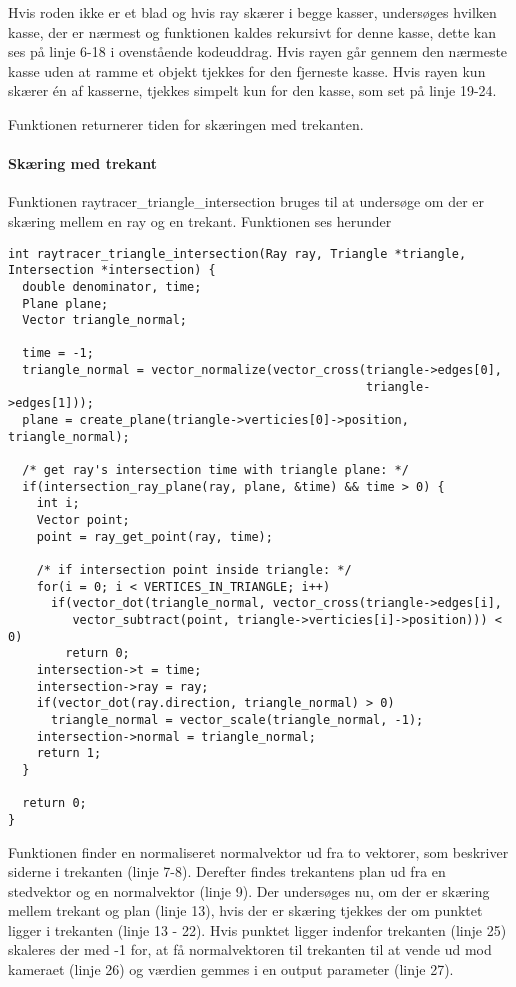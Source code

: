 Hvis roden ikke er et blad og hvis ray skærer i begge kasser, undersøges hvilken kasse, der er nærmest og funktionen kaldes rekursivt for denne kasse, dette kan ses på linje 6-18 i ovenstående kodeuddrag. Hvis rayen går gennem den nærmeste kasse uden at ramme et objekt tjekkes for den fjerneste kasse. Hvis rayen kun skærer én af kasserne, tjekkes simpelt kun for den kasse, som set på linje 19-24.

Funktionen returnerer tiden for skæringen med trekanten.

\paragraph{Skæring med trekant}

Funktionen raytracer\_triangle\_intersection bruges til at undersøge om der er skæring mellem en ray og en trekant. Funktionen ses herunder

\begin{lstlisting}[style=Cstyle, caption={Funktionen, der finder skæring med trekant}]
int raytracer_triangle_intersection(Ray ray, Triangle *triangle, Intersection *intersection) {
  double denominator, time;
  Plane plane;
  Vector triangle_normal;
  
  time = -1;
  triangle_normal = vector_normalize(vector_cross(triangle->edges[0], 
                                                  triangle->edges[1]));
  plane = create_plane(triangle->verticies[0]->position, triangle_normal);

  /* get ray's intersection time with triangle plane: */
  if(intersection_ray_plane(ray, plane, &time) && time > 0) {
    int i;
    Vector point;
    point = ray_get_point(ray, time);
    
    /* if intersection point inside triangle: */
    for(i = 0; i < VERTICES_IN_TRIANGLE; i++)
      if(vector_dot(triangle_normal, vector_cross(triangle->edges[i], 
         vector_subtract(point, triangle->verticies[i]->position))) < 0)
        return 0;
    intersection->t = time;
    intersection->ray = ray;
    if(vector_dot(ray.direction, triangle_normal) > 0)
      triangle_normal = vector_scale(triangle_normal, -1);
    intersection->normal = triangle_normal;
    return 1;
  }

  return 0;
}
\end{lstlisting}

Funktionen finder en normaliseret normalvektor ud fra to vektorer, som beskriver siderne i trekanten (linje 7-8). Derefter findes trekantens plan ud fra en stedvektor og en normalvektor (linje 9). Der undersøges nu, om der er skæring mellem trekant og plan (linje 13), hvis der er skæring tjekkes der om punktet ligger i trekanten (linje 13 - 22). Hvis punktet ligger indenfor trekanten (linje 25) skaleres der med -1 for, at få normalvektoren til trekanten til at vende ud mod kameraet (linje 26) og værdien gemmes i en output parameter (linje 27).

